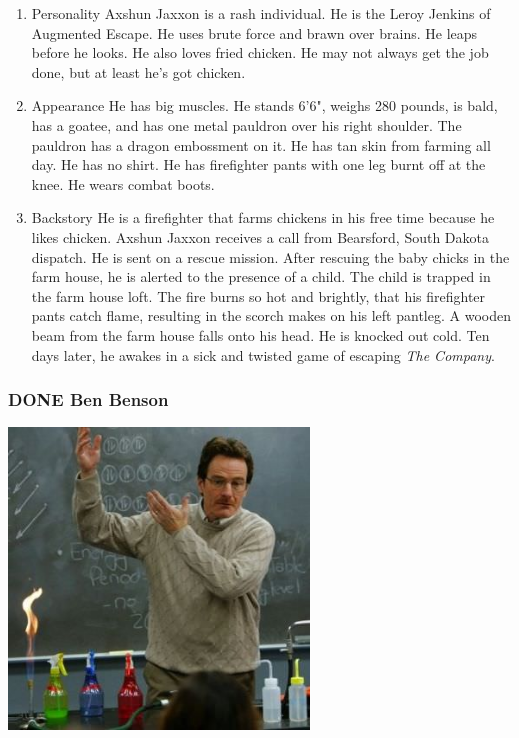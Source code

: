 \documentclass[11pt]{article}
\begin{document}
\begin{enumerate}
\item Personality
\label{sec:org4193f1c}
Axshun Jaxxon is a rash individual. He is the Leroy Jenkins of Augmented Escape. He uses brute force and brawn over brains. He leaps before he looks. He also loves fried chicken. He may not always get the job done, but at least he's got chicken.

\item Appearance
\label{sec:org7f9bfb5}
He has big muscles. He stands 6'6", weighs 280 pounds, is bald, has a goatee, and has one metal pauldron over his right shoulder. The pauldron has a dragon embossment on it. He has tan skin from farming all day. He has no shirt. He has firefighter pants with one leg burnt off at the knee. He wears combat boots.

\item Backstory
\label{sec:org2282292}
He is a firefighter that farms chickens in his free time because he likes chicken. Axshun Jaxxon receives a call from Bearsford, South Dakota dispatch. He is sent on a rescue mission. After rescuing the baby chicks in the farm house, he is alerted to the presence of a child. The child is trapped in the farm house loft. The fire burns so hot and brightly, that his firefighter pants catch flame, resulting in the scorch makes on his left pantleg. A wooden beam from the farm house falls onto his head. He is knocked out cold. Ten days later, he awakes in a sick and twisted game of escaping \emph{The Company}.
\end{enumerate}

\subsubsection{{\bfseries\sffamily DONE} Ben Benson}
\label{sec:org3e54d3b}
\begin{center}
\includegraphics[width=8cm]{./img/ben-benson.png}
\end{center}
\end{document}
